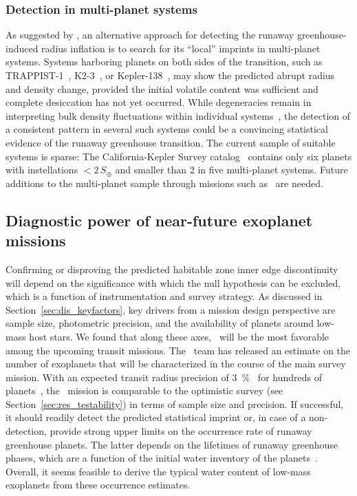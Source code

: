 \documentclass[twocolumn,twocolappendix,linenumbers]{aastex631}
\begin{document}
\subsubsection{Detection in multi-planet systems}
As suggested by \citet{Turbet2019}, an alternative approach for detecting the runaway greenhouse-induced radius inflation is to search for its ``local'' imprints in multi-planet systems.
Systems harboring planets on both sides of the transition, such as \mbox{TRAPPIST-1}~\citep{Gillon2016a,Gillon2017a,Luger2017c,Agol2021}, \mbox{K2-3}~\citep{2022AJ....164..172D}, or \mbox{Kepler-138}~\citep{2022NatAs.tmp..269P}, may show the predicted abrupt radius and density change, provided the initial volatile content was sufficient and complete desiccation has not yet occurred.
While degeneracies remain in interpreting bulk density fluctuations within individual systems~\citep[e.g.,][]{Turbet2020,Dorn2021}, the detection of a consistent pattern in several such systems could be a convincing statistical evidence of the runaway greenhouse transition.
The current sample of suitable systems is sparse: The California-Kepler Survey catalog~\citep{Fulton2018} contains only six planets with instellations $< 2\, S_\oplus$ and smaller than \SI{2}{\rEarth} in five multi-planet systems.
Future additions to the multi-planet sample through missions such as \plato\ are needed.

\subsection{Diagnostic power of near-future exoplanet missions}\label{sec:dis_samplesize}
Confirming or disproving the predicted habitable zone inner edge discontinuity will depend on the significance with which the null hypothesis can be excluded, which is a function of instrumentation and survey strategy.
As discussed in Section~\ref{sec:dis_keyfactors}, key drivers from a mission design perspective are sample size, photometric precision, and the availability of planets around low-mass host stars.
We found that along these axes, \plato\ will be the most favorable among the upcoming transit missions.
The \plato\ team has released an estimate on the number of exoplanets that will be characterized in the course of the main survey mission. %
With an expected transit radius precision of \SI{3}{\percent}~\citep{plato2017} for hundreds of planets~\citep{Rauer2021}, the \plato\ mission is comparable to the optimistic survey (see Section~\ref{sec:res_testability}) in terms of sample size and precision.
If successful, it should readily detect the predicted statistical imprint or, in case of a non-detection, provide strong upper limits on the occurrence rate of runaway greenhouse planets.
The latter depends on the lifetimes of runaway greenhouse phases, which are a function of the initial water inventory of the planets~\citep{Hamano2015}.
Overall, it seems feasible to derive the typical water content of low-mass exoplanets from these occurrence estimates.
\end{document}
